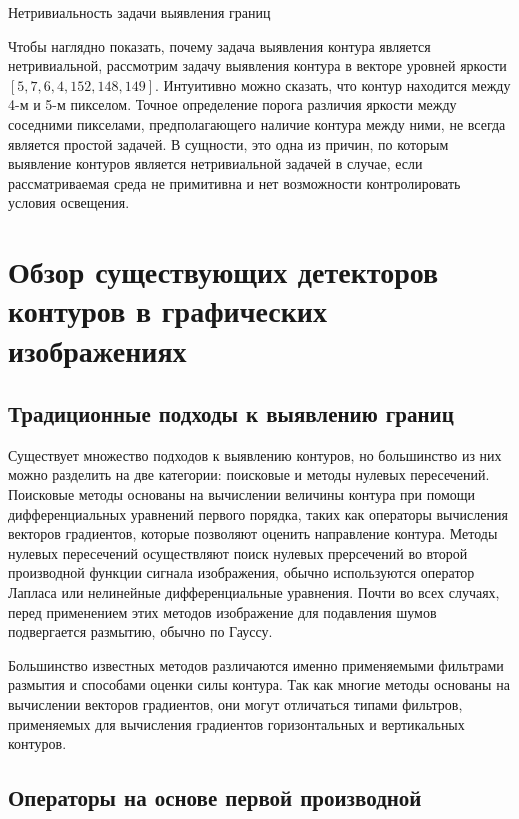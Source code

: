 \documentclass[a4paper,12pt]{report}
\begin{document}
\Large{Нетривиальность задачи выявления границ}

\normalsize Чтобы наглядно показать, почему задача выявления контура является нетривиальной, рассмотрим задачу выявления контура в векторе уровней яркости $[5,7,6,4,152,148,149]$. Интуитивно можно сказать, что контур находится между 4-м и 5-м пикселом. Точное определение порога различия яркости между соседними пикселами, предполагающего наличие контура между ними, не всегда является простой задачей. В сущности, это одна из причин, по которым выявление контуров является нетривиальной задачей в случае, если рассматриваемая среда не примитивна и нет возможности контролировать условия освещения. 

\setcounter{secnumdepth}{4}
\chapter{Обзор существующих детекторов контуров в графических изображениях}
\section{Традиционные подходы к выявлению границ}
Существует множество подходов к выявлению контуров, но большинство из них можно разделить на две категории: поисковые и методы нулевых пересечений. Поисковые методы основаны на вычислении величины контура при помощи дифференциальных уравнений первого порядка, таких как операторы вычисления векторов градиентов, которые позволяют оценить направление контура. Методы нулевых пересечений осуществляют поиск нулевых прерсечений во второй производной функции сигнала изображения, обычно используются оператор Лапласа или нелинейные дифференциальные уравнения. Почти во всех случаях, перед применением этих методов изображение для подавления шумов подвергается размытию, обычно по Гауссу.

Большинство известных методов различаются именно применяемыми фильтрами размытия и способами оценки силы контура. Так как многие методы основаны на вычислении векторов градиентов, они могут отличаться типами фильтров, применяемых для вычисления градиентов горизонтальных и вертикальных контуров.
\section{Операторы на основе первой производной}
\end{document}
